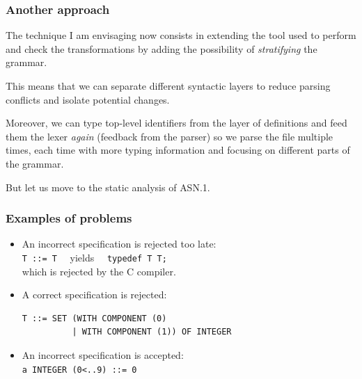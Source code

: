 \documentclass[compress,dvips,xcolor={dvipsnames},t]{beamer}
\newcommand\ASN{\textsf{ASN.1}\xspace}
\begin{document}
\begin{frame}
\frametitle{Another approach}

The technique I am envisaging now consists in extending the tool used
to perform and check the transformations by adding the possibility of
\emph{stratifying} the grammar.

\bigskip

This means that we can separate different syntactic layers to reduce
parsing conflicts and isolate potential changes.

\bigskip

Moreover, we can type top-level identifiers from the layer of
definitions and feed them the lexer \emph{again} (feedback from the
parser) so we parse the file multiple times, each time with more
typing information and focusing on different parts of the grammar.

\bigskip

But let us move to the static analysis of \ASN.

\end{frame}


\begin{frame}[containsverbatim]
\frametitle{Examples of problems}

\begin{itemize}

  \item An incorrect specification is rejected too late:\\
        \verb+T ::= T+ \ \ yields \ \ \verb+typedef T T;+\\
        which is rejected by the C compiler.

\bigskip

  \item A correct specification is rejected:
\begin{verbatim}
T ::= SET (WITH COMPONENT (0)
          | WITH COMPONENT (1)) OF INTEGER
\end{verbatim}

\bigskip

   \item An incorrect specification is accepted:\\
         \verb+a INTEGER (0<..9) ::= 0+

\end{itemize}

\end{frame}

\end{document}
